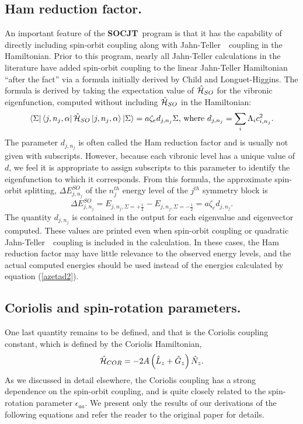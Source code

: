 \documentclass{article}
\newcommand{\JT}{Jahn-Teller\ }
\newcommand{\socjt}{{\bf SOCJT}}
\begin{document}
\subsection{Ham reduction factor.} An important feature of the \socjt\
program is that it has the 
capability of directly including spin-orbit coupling along with \JT\
coupling in the Hamiltonian. Prior to this program, nearly all
Jahn-Teller calculations in the literature have added spin-orbit 
coupling to the linear Jahn-Teller Hamiltonian ``after the fact'' via a
formula initially derived by Child and Longuet-Higgins.\cite{jttheory9} The
formula is derived by taking the expectation value of $\hat{\cal H}_{SO}$ 
for the vibronic eigenfunction, computed without including $\hat{\cal H}_{SO}$
in the Hamiltonian: 
\begin{equation}
\left\langle \Sigma \right|
\left\langle j,n_{j},\alpha \right| \hat{\cal H}_{SO}
\left| j,n_{j},\alpha \right\rangle \left| \Sigma \right\rangle
=a\zeta _{e}d_{j,n_{j}}\Sigma \text{, where
  }d_{j,n_{j}}=\sum_i\Lambda 
_ic_{i,n_{j}}^{2}.  \label{ham parm definition}
\end{equation}
The parameter $d_{j,n_{j}}$ is often called the Ham reduction factor and is usually
not given with subscripts. However, because each
vibronic level has a unique value of $d$, we feel it is appropriate to
assign subscripts to this parameter to identify the eigenfunction to which
it corresponds. From this formula, the approximate spin-orbit
splitting, $\Delta E_{j,n_j}^{SO}$ of the $n_{j}^{th}$ energy level of
the $j^{th}$ symmetry block is  
\begin{equation}
\Delta E_{j,n_{j}}^{SO}= E_{j,n_j,\Sigma = +\frac12 } - 
E_{j,n_j,\Sigma = -\frac12 } = a\zeta _{e}d_{j,n_{j}}.  \label{azetad2}
\end{equation}
The quantity $d_{j,n_{j}}$ is contained in the output for each
eigenvalue and eigenvector computed. These values are printed even
when spin-orbit coupling or quadratic \JT\ coupling is included in the
calculation. In these cases, the Ham reduction factor may have little
relevance to the observed energy levels, and the actual computed
energies should be used instead of the energies calculated by equation
(\ref{azetad2}). 

\subsection{Coriolis and spin-rotation parameters.} 
One last quantity remains to be defined, and that is the Coriolis
coupling constant, which is defined by the Coriolis Hamiltonian,
\begin{equation}
\hat{\cal H}_{COR} = -2A \left( \hat{L}_z + \hat{G}_z \right)
\hat{N}_z .
\label{HCOR}
\end{equation}
As we discussed in detail elsewhere,\cite{tab4,tab11} the Coriolis
coupling has a strong dependence on the spin-orbit coupling, and is
quite closely related to the spin-rotation parameter $\epsilon
_{aa}$. We present only the results of our derivations of the
following equations and refer the reader to the original
paper\cite{tab4} for details. 
\end{document}
